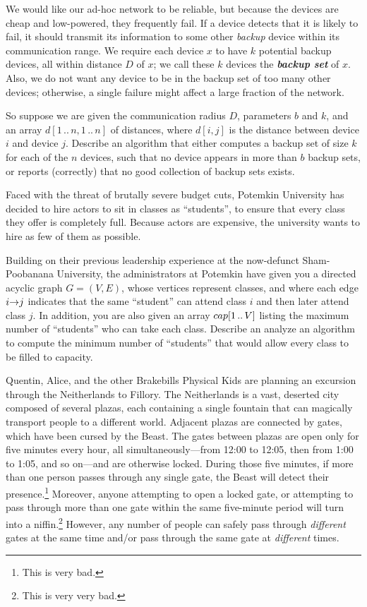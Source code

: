 \begin{exercises}
We would like our ad-hoc network to be reliable, but because the devices are cheap and low-powered, they frequently fail.
If a device detects that it is likely to fail, it should transmit its information to some other \textit{backup} device within its communication range.
We require each device $x$ to have $k$ potential backup devices, all within distance $D$ of $x$; we call these $k$ devices the \textbf{\textit{backup set}} of $x$.
Also, we do not want any device to be in the backup set of too many other devices; otherwise, a single failure might affect a large fraction of the network.

So suppose we are given the communication radius $D$, parameters $b$ and $k$, and an array $d[1\,..\,n,1\,..\,n]$ of distances, where $d[i,j]$ is the distance between device $i$ and device $j$.
Describe an algorithm that either computes a backup set of size $k$ for each of the $n$ devices, such that no device appears in more than $b$ backup sets, or reports (correctly) that no good collection of backup sets exists.

\item
\label{ex:11.18}
Faced with the threat of brutally severe budget cuts, Potemkin University has decided to hire actors to sit in classes as “students”, to ensure that every class they offer is completely full.
Because actors are expensive, the university wants to hire as few of them as possible.

Building on their previous leadership experience at the now-defunct Sham-Poobanana University, the administrators at Potemkin have given you a directed acyclic graph $G = (V,E)$, whose vertices represent classes, and where each edge $i\mathord{\rightarrow}j$ indicates that the same “student” can attend class $i$ and then later attend class $j$.
In addition, you are also given an array $cap[1\,..\,V]$ listing the maximum number of “students” who can take each class.
Describe an analyze an algorithm to compute the minimum number of “students” that would allow every class to be filled to capacity.

\item
\label{ex:11.19}
Quentin, Alice, and the other Brakebills Physical Kids are planning an excursion through the Neitherlands to Fillory.
The Neitherlands is a vast, deserted city composed of several plazas, each containing a single fountain that can magically transport people to a different world.
Adjacent plazas are connected by gates, which have been cursed by the Beast.
The gates between plazas are open only for five minutes every hour, all simultaneously—from 12:00 to 12:05, then from 1:00 to 1:05, and so on—and are otherwise locked.
During those five minutes, if more than one person passes through any single gate, the Beast will detect their presence.\footnote{This is very bad.}
Moreover, anyone attempting to open a locked gate, or attempting to pass through more than one gate within the same five-minute period will turn into a niffin.\footnote{This is very very bad.}
However, any number of people can safely pass through \textit{different} gates at the same time and/or pass through the same gate at \textit{different} times.


\end{exercises}
